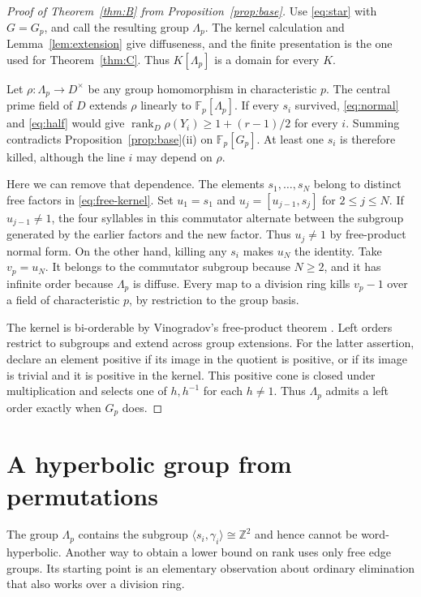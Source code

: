 \documentclass[11pt,a4paper]{article}
\numberwithin{equation}{section}
\DeclareMathOperator{\rk}{rank}
\newcommand{\F}{\mathbb F}
\begin{document}
\begin{proof}[Proof of Theorem~\ref{thm:B} from Proposition~\ref{prop:base}]
Use \eqref{eq:star} with \(G=G_p\), and call the resulting group \(\Lambda_p\). The kernel calculation and Lemma~\ref{lem:extension} give diffuseness, and the finite presentation is the one used for Theorem~\ref{thm:C}. Thus \(K[\Lambda_p]\) is a domain for every \(K\).

Let \(\rho:\Lambda_p\to D^\times\) be any group homomorphism in characteristic \(p\). The central prime field of \(D\) extends \(\rho\) linearly to \(\F_p[\Lambda_p]\). If every \(s_i\) survived, \eqref{eq:normal} and \eqref{eq:half} would give \(\rk_D\rho(Y_i)\ge1+(r-1)/2\) for every \(i\). Summing contradicts Proposition~\ref{prop:base}(ii) on \(\F_p[G_p]\). At least one \(s_i\) is therefore killed, although the line \(i\) may depend on \(\rho\).

Here we can remove that dependence. The elements \(s_1,\ldots,s_N\) belong to distinct free factors in \eqref{eq:free-kernel}. Set \(u_1=s_1\) and \(u_j=[u_{j-1},s_j]\) for \(2\le j\le N\). If \(u_{j-1}\ne1\), the four syllables in this commutator alternate between the subgroup generated by the earlier factors and the new factor. Thus \(u_j\ne1\) by free-product normal form. On the other hand, killing any \(s_i\) makes \(u_N\) the identity. Take \(v_p=u_N\). It belongs to the commutator subgroup because \(N\ge2\), and it has infinite order because \(\Lambda_p\) is diffuse. Every map to a division ring kills \(v_p-1\) over a field of characteristic \(p\), by restriction to the group basis.

The kernel is bi-orderable by Vinogradov's free-product theorem \cite{r24}. Left orders restrict to subgroups and extend across group extensions. For the latter assertion, declare an element positive if its image in the quotient is positive, or if its image is trivial and it is positive in the kernel. This positive cone is closed under multiplication and selects one of \(h,h^{-1}\) for each \(h\ne1\). Thus \(\Lambda_p\) admits a left order exactly when \(G_p\) does.
\end{proof}

\section{A hyperbolic group from permutations}\label{sec:hyperbolic}

The group \(\Lambda_p\) contains the subgroup
\(\langle s_i,\gamma_i\rangle\cong\mathbb Z^2\) and hence cannot be
word-hyperbolic. Another way to obtain a lower bound on rank uses only
free edge groups. Its starting point is an elementary observation
about ordinary elimination that also works over a division ring.
\end{document}
